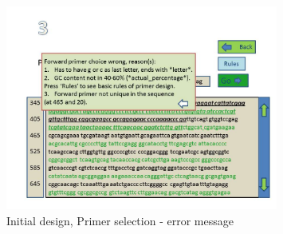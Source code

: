 \begin{frame}

\begin{figure}[h]
  \begin{center}
	\includegraphics[width=0.8\textwidth]{./img/UiDes/slide5.jpg}
    \caption{
      \label{fig:UiDes:slide5}
      Initial design, Primer selection - error message
    }
  \end{center}
\end{figure}

\end{frame}

